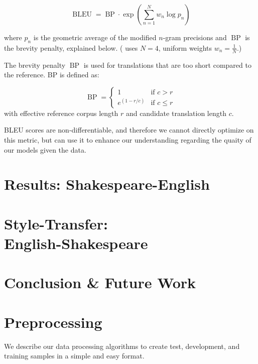 \documentclass[twoside,twocolumn]{article}
\begin{document}
\begin{equation}
  \operatorname{BLEU} = \operatorname{BP} \cdot \exp \left( \sum_{n=1}^N w_n \log p_n \right)
\end{equation}

\noindent
where $p_n$ is the geometric average of the modified $n$-gram precisions
and $\operatorname{BP}$ is the brevity penalty, explained below.
(\cite{papineni2002bleu} uses $N=4$, uniform weights $w_n = \frac{1}{N}$.)

The brevity penalty $\operatorname{BP}$ is used for translations that are
too short compared to the reference. BP is defined as:

\begin{equation}
  \operatorname{BP} = \begin{cases}
    1 & \text{if } c > r \\
    e^{(1-r/c)} & \text{if } c \leq r
  \end{cases}
\end{equation}
\noindent
with effective reference corpus length $r$ and candidate translation length $c$.

BLEU scores are non-differentiable, and therefore we cannot directly optimize
on this metric, but can use it to enhance our understanding regarding the
quaity of our models given the data.

\section{Results: Shakespeare-English}
\label{sec:results}
\section{Style-Transfer:\\English-Shakespeare}
\label{sec:style-transfer}
\section{Conclusion \& Future Work}
\label{sec:conclusion}






\section{Preprocessing}
We describe our data processing algorithms to create test, development,
and training samples in a simple and easy format.
\end{document}
